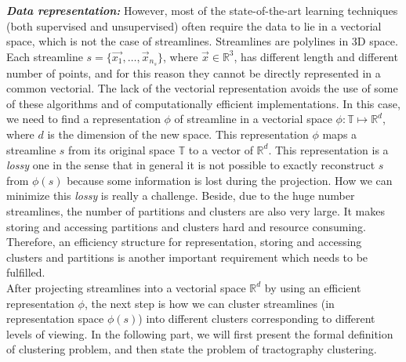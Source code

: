 \textbf{\textit{Data representation:}}
However, most of the state-of-the-art learning techniques (both supervised and unsupervised) 
often require the data to lie in a vectorial space, which is not the case of streamlines. Streamlines are polylines in $3$D space. Each streamline $s =\{ \vec{x_1},\ldots,\vec{x}_{n_s}\}$, where $\vec{x} \in \mathbb{R}^3$, has different length and different number of points, and for this reason they cannot be directly represented in a common vectorial. The lack of the vectorial representation avoids the use of some of these algorithms and of computationally efficient implementations. In this case, we need to find a representation $\phi$ of streamline in a vectorial space $\phi : \mathbb{T} \mapsto \mathbb{R}^d$, where $d$ is the dimension of the new space. This representation $\phi$ maps a streamline $s$ from its original space $\mathbb{T}$ to a
vector of $\mathbb{R}^d$. This representation is a \emph{lossy} one in the sense that in general it is not possible to exactly reconstruct $s$ from $\phi(s)$ because some information is lost during the projection. How we can minimize this \emph{lossy} is really a challenge. 
Beside, due to the huge number streamlines, the number of partitions and clusters are also very large. It makes storing and accessing partitions and clusters hard and resource consuming. Therefore, an efficiency structure for representation, storing and accessing clusters and partitions is another important requirement which needs to be fulfilled.
\\After projecting streamlines into a vectorial space $\mathbb{R}^d$ by using an efficient representation $\phi$, the next step is how we can cluster streamlines (in representation space $\phi(s)$) into different clusters corresponding to different levels of viewing.%
In the following part, we will first present the formal definition of clustering problem, and then state the problem of tractography clustering.

